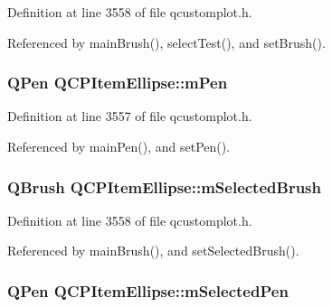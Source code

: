 Definition at line 3558 of file qcustomplot.\+h.



Referenced by main\+Brush(), select\+Test(), and set\+Brush().

\hypertarget{class_q_c_p_item_ellipse_a16ad9389acf028a7e4ac8fd7a550b2e4}{}
\subsubsection[{m\+Pen}]{\setlength{\rightskip}{0pt plus 5cm}Q\+Pen Q\+C\+P\+Item\+Ellipse\+::m\+Pen\hspace{0.3cm}{\ttfamily [protected]}}\label{class_q_c_p_item_ellipse_a16ad9389acf028a7e4ac8fd7a550b2e4}


Definition at line 3557 of file qcustomplot.\+h.



Referenced by main\+Pen(), and set\+Pen().

\hypertarget{class_q_c_p_item_ellipse_a2e49d5547478aa36910ed8a2dcc8a5c0}{}
\subsubsection[{m\+Selected\+Brush}]{\setlength{\rightskip}{0pt plus 5cm}Q\+Brush Q\+C\+P\+Item\+Ellipse\+::m\+Selected\+Brush\hspace{0.3cm}{\ttfamily [protected]}}\label{class_q_c_p_item_ellipse_a2e49d5547478aa36910ed8a2dcc8a5c0}


Definition at line 3558 of file qcustomplot.\+h.



Referenced by main\+Brush(), and set\+Selected\+Brush().

\hypertarget{class_q_c_p_item_ellipse_a57b047abfce6f1a84ed46ca668c90e21}{}
\subsubsection[{m\+Selected\+Pen}]{\setlength{\rightskip}{0pt plus 5cm}Q\+Pen Q\+C\+P\+Item\+Ellipse\+::m\+Selected\+Pen\hspace{0.3cm}{\ttfamily [protected]}}\label{class_q_c_p_item_ellipse_a57b047abfce6f1a84ed46ca668c90e21}



